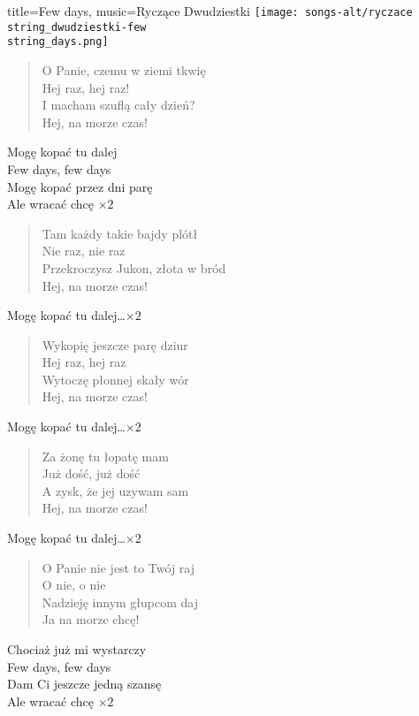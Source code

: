 \newpage
\begin{song}{title={Few days}, music={Ryczące Dwudziestki}}
\texttt{[image: songs-alt/ryczace\\string\_dwudziestki-few\\string\_days.png]}
\begin{multicols}{2}
    \begin{verse}
        O Panie, czemu w ziemi tkwię \\
		Hej raz, hej raz! \\
		I macham szuflą cały dzień? \\
		Hej, na morze czas! 
    \end{verse}
    \begin{chorus}
        Mogę kopać tu dalej \\
		Few days, few days \\
		Mogę kopać przez dni parę \\ 
		Ale wracać chcę  $\times 2$ 
    \end{chorus}
    \begin{verse}
        Tam każdy takie bajdy plótł \\
		Nie raz, nie raz \\
		Przekroczysz Jukon, złota w bród \\
		Hej, na morze czas! 
    \end{verse}
    \begin{chorus}
        Mogę kopać tu dalej\ldots $\times 2$ 
    \end{chorus}
    \begin{verse}
        Wykopię jeszcze parę dziur \\
		Hej raz, hej raz \\
		Wytoczę płonnej skały wór \\
		Hej, na morze czas!
    \end{verse}
    \begin{chorus}
        Mogę kopać tu dalej\ldots $\times 2$ 
    \end{chorus}
    \begin{verse}
        Za żonę tu łopatę mam \\
		Już dość, już dość \\
		A zysk, że jej uzywam sam \\
		Hej, na morze czas!
    \end{verse}
    \begin{chorus}
        Mogę kopać tu dalej\ldots $\times 2$ 
    \end{chorus}
    \begin{verse}
        O Panie nie jest to Twój raj \\
		O nie, o nie \\
		Nadzieję innym głupcom daj \\
		Ja na morze chcę!
    \end{verse}
    \begin{chorus}
        Chociaż już mi wystarczy \\
		Few days, few days \\
		Dam Ci jeszcze jedną szansę \\
		Ale wracać chcę $\times 2$ 
    \end{chorus}
\end{multicols}
\end{song}

